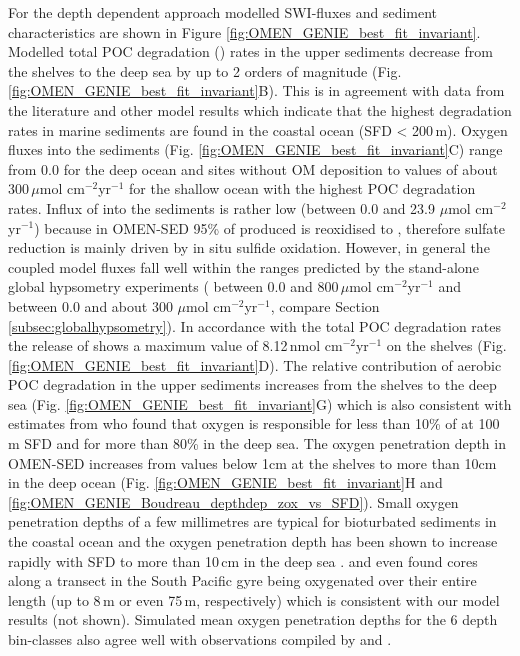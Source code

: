 \documentclass[gmd, manuscript]{copernicus}
\begin{document}
For the depth dependent \citet{boudreau1997diagenetic} approach modelled SWI-fluxes and sediment characteristics are shown in Figure \ref{fig:OMEN_GENIE_best_fit_invariant}.
Modelled total POC degradation () rates in the upper sediments decrease from the shelves to the deep sea by up to 2 orders of magnitude (Fig. \ref{fig:OMEN_GENIE_best_fit_invariant}B). 
This is in agreement with data from the literature \citep[e.g.][]{middelburg_organic_1993, middelburg_empirical_1997, burdige_preservation_2007} 
and other model results \citep[e.g.][]{thullner_global_scale_2009} which indicate that the highest degradation rates in marine sediments are found in the coastal ocean (SFD < 200\,m). 
Oxygen fluxes into the sediments (Fig. \ref{fig:OMEN_GENIE_best_fit_invariant}C) range from 0.0 for the deep ocean and sites without OM deposition to values of about 300\,$\mu$mol cm$^{-2}$yr$^{-1}$ for the shallow ocean with the highest POC degradation rates. 
Influx of   into the sediments is rather low (between 0.0 and 23.9 $\mu$mol cm$^{-2}$yr$^{-1}$) because in OMEN-SED 95\% of produced  is reoxidised to , therefore sulfate reduction is mainly driven by in situ sulfide oxidation. 
However, in general the coupled model fluxes fall well within the ranges predicted by the stand-alone global hypsometry experiments ( between 0.0 and 800\,$\mu$mol cm$^{-2}$yr$^{-1}$ and  between 0.0 and about 300 $\mu$mol cm$^{-2}$yr$^{-1}$, 
compare Section \ref{subsec:globalhypsometry}). 
In accordance with the total POC degradation rates the release of  shows a maximum value of 8.12\,nmol cm$^{-2}$yr$^{-1}$ on the shelves (Fig. \ref{fig:OMEN_GENIE_best_fit_invariant}D). 
The relative contribution of aerobic POC degradation in the upper sediments increases from the shelves to the deep sea (Fig. \ref{fig:OMEN_GENIE_best_fit_invariant}G) 
which is also consistent with estimates from %
\citet{thullner_global_scale_2009} who found that oxygen is responsible for less than 10\% of  at 100\,m SFD and for more 
than 80\% in the deep sea. 
The oxygen penetration depth in OMEN-SED increases from values below 1cm at the shelves to more than 10cm in the deep ocean (Fig. \ref{fig:OMEN_GENIE_best_fit_invariant}H 
and \ref{fig:OMEN_GENIE_Boudreau_depthdep_zox_vs_SFD}).
Small oxygen penetration depths of a few millimetres are typical for bioturbated sediments in the coastal ocean \citep[e.g.][]{wenzhofer_benthic_2002} and 
the oxygen penetration depth has been shown to increase rapidly with SFD to more than 10\,cm in the deep sea \citep{meile_global_2003, glud_oxygen_2008}. 
\citet{fischer_oxygen_2009} and \citet{dhondt_presence_2015} even found cores along a transect in the South Pacific gyre being oxygenated over their entire length (up to 8\,m or even 75\,m, respectively) which is consistent 
with our model results (not shown). Simulated mean oxygen penetration depths for the 6 depth bin-classes also agree well with observations compiled by \citet{glud_oxygen_2008} and 
\citet[][Fig. \ref{fig:OMEN_GENIE_Boudreau_depthdep_zox_vs_SFD}]{meile_global_2003}.
\end{document}
